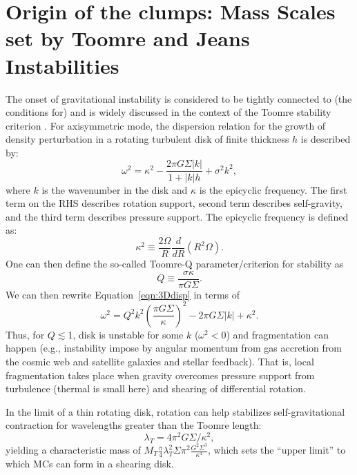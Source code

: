 \documentclass[iop]{emulateapj}
\begin{document}
\section{Origin of the clumps: Mass Scales set by Toomre and Jeans Instabilities}   \label{sec:Q}
The onset of gravitational instability is considered to be tightly connected to (the conditions for) \SF \citep[e.g.,][]{Kennicutt89a, Li05b, Li06a}
and is widely discussed in the context of the Toomre stability criterion \citep{Toomre64a, Goldreich65b}.
For axisymmetric mode, the dispersion relation for the growth of density perturbation in a rotating turbulent disk
of finite thickness $h$
is described by:
\begin{equation}
\omega^2 = \kappa^2 - \frac{2\pi G \Sigma |k|}{1 + |k| h} + \sigma^2 k^2,
\label{eqn:3Ddisp}
\end{equation}
where $k$ is the wavenumber in the disk and $\kappa$ is the epicyclic frequency.
The first term on the RHS describes rotation support, second term describes self-gravity, and
the third term describes pressure support.
The epicyclic frequency is defined as:
\begin{equation}
\kappa^2\equiv\frac{2\Omega}{R}\frac{d}{dR}\left(R^2\Omega\right).
\label{eqn:kappa}
\end{equation}
One can then define the so-called Toomre-Q parameter/criterion for stability as
\begin{equation}
Q\equiv\frac{\sigma\kappa}{\pi G \Sigma}.
\label{eqn:Q}
\end{equation}
We can then rewrite Equation~\ref{eqn:3Ddisp} in terms of
\begin{equation}
\omega^2 = Q^2 k^2 \left(\frac{\pi G \Sigma}{\kappa}\right)^2 - 2\pi G \Sigma |k| + \kappa^2.
\end{equation}
Thus, for $Q\lesssim$1, disk is unstable for some $k$ ($\omega^2 < 0$)
and fragmentation can happen
(e.g., instability impose by angular momentum from gas accretion from the cosmic web and
satellite galaxies and stellar feedback).
That is, local fragmentation takes place when gravity overcomes pressure support
from turbulence (thermal is small here) and shearing of differential rotation.

In the limit of a thin rotating disk, rotation can help stabilizes
self-gravitational contraction for wavelengths greater than the Toomre length:
\begin{equation}
\lambda_T = 4\pi^2 G\Sigma/\kappa^2,
\end{equation}
yielding a characteristic mass of $M_T$\eq$\frac{\pi}{4}{\lambda_T^2}{\Sigma}$$\pi^2\frac{G^2\Sigma^3}{\kappa^4}$,
which sets the ``upper limit'' to which MCs can form in a shearing disk.
\end{document}
